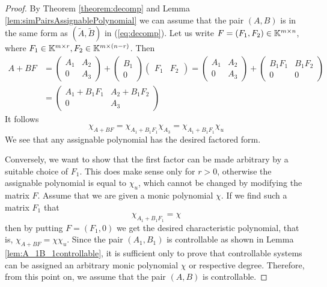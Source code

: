 \begin{proof}
    By Theorem \ref{theorem:decomp} and Lemma \ref{lem:simPairsAssignablePolynomial} we can assume that the pair $(A,B)$ is in the same form as $(\widetilde{A},\widetilde{B})$ in (\ref{eq:decomp}). Let us write $F=(F_1,F_2)\in\mathbb{K}^{m\times n}$, where $F_1\in\mathbb{K}^{m\times r}, F_2\in\mathbb{K}^{m\times (n-r)}$. Then 
    \begin{align*}
        A+BF&=
        \begin{pmatrix}
            A_1 & A_2 \\
            0   & A_3
        \end{pmatrix}
        +
        \begin{pmatrix}
            B_1 \\
            0
        \end{pmatrix}
        \begin{pmatrix}
            F_1 & F_2
        \end{pmatrix}
        =
        \begin{pmatrix}
            A_1 & A_2 \\
            0   & A_3
        \end{pmatrix}
        +
        \begin{pmatrix}
            B_1F_1 & B_1F_2 \\
            0 & 0
        \end{pmatrix}
        \\
        &=
        \begin{pmatrix}
            A_1+B_1F_1 & A_2+B_1F_2 \\
            0 & A_3
        \end{pmatrix}
    \end{align*}
    It follows 
    $$\chi_{A+BF}=\chi_{A_1+B_1F_1}\chi_{A_3}=\chi_{A_1+B_1F_1}\chi_u$$
    We see that any assignable polynomial has the desired factored form.

    Conversely, we want to show that the first factor can be made arbitrary by a suitable choice of $F_1$. This does make sense only for $r>0$, otherwise the assignable polynomial is equal to $\chi_u$, which cannot be changed by modifying the matrix $F$. Assume that we are given a monic polynomial $\chi$. If we find such a matrix $F_1$ that 
    $$\chi_{A_1+B_1F_1}=\chi$$
    then by putting $F=(F_1,0)$ we get the desired characteristic polynomial, that is, $\chi_{A+BF}=\chi\chi_u$. Since the pair $(A_1,B_1)$ is controllable as shown in Lemma \ref{lem:A_1B_1controllable}, it is sufficient only to prove that controllable systems can be assigned an arbitrary monic polynomial $\chi$ or respective degree. Therefore, from this point on, we assume that the pair $(A,B)$ is controllable.


\end{proof}
